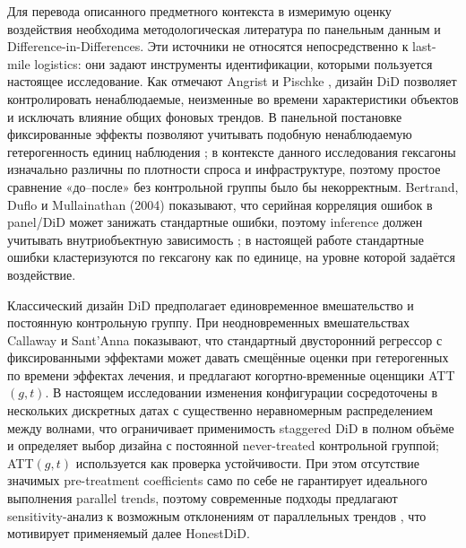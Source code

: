 \documentclass[14pt,a4paper]{extarticle}
\begin{document}
Для перевода описанного предметного контекста в измеримую оценку воздействия необходима методологическая литература по панельным данным и Difference-in-Differences. Эти источники не относятся непосредственно к last-mile logistics: они задают инструменты идентификации, которыми пользуется настоящее исследование. Как отмечают Angrist и Pischke \cite{angrist2009}, дизайн DiD позволяет контролировать ненаблюдаемые, неизменные во времени характеристики объектов и исключать влияние общих фоновых трендов. В панельной постановке фиксированные эффекты позволяют учитывать подобную ненаблюдаемую гетерогенность единиц наблюдения \cite{wooldridge2010}; в контексте данного исследования гексагоны изначально различны по плотности спроса и инфраструктуре, поэтому простое сравнение «до--после» без контрольной группы было бы некорректным. Bertrand, Duflo и Mullainathan (2004) показывают, что серийная корреляция ошибок в panel/DiD может занижать стандартные ошибки, поэтому inference должен учитывать внутриобъектную зависимость \cite{bertrand2004}; в настоящей работе стандартные ошибки кластеризуются по гексагону как по единице, на уровне которой задаётся воздействие.

Классический дизайн DiD предполагает единовременное вмешательство и постоянную контрольную группу. При неодновременных вмешательствах Callaway и Sant'Anna \cite{callaway2021} показывают, что стандартный двусторонний регрессор с фиксированными эффектами может давать смещённые оценки при гетерогенных по времени эффектах лечения, и предлагают когортно-временные оценщики ATT\((g,t)\). В настоящем исследовании изменения конфигурации сосредоточены в нескольких дискретных датах с существенно неравномерным распределением между волнами, что ограничивает применимость staggered DiD в полном объёме и определяет выбор дизайна с постоянной never-treated контрольной группой; ATT\((g,t)\) используется как проверка устойчивости. При этом отсутствие значимых pre-treatment coefficients само по себе не гарантирует идеального выполнения parallel trends, поэтому современные подходы предлагают sensitivity-анализ к возможным отклонениям от параллельных трендов \cite{rambachan2023credible}, что мотивирует применяемый далее HonestDiD.
\end{document}
